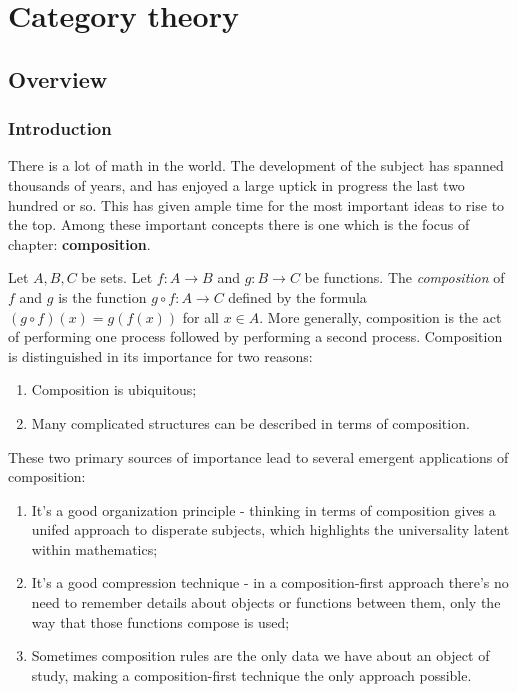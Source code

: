\section{Category theory}
\label{category-theory}

\subsection{Overview}

\subsubsection{Introduction}

There is a lot of math in the world. The development of the subject has spanned thousands of years, and has enjoyed a large uptick in progress the last two hundred or so. This has given ample time for the most important ideas to rise to the top. Among these important concepts there is one which is the focus of chapter: \textbf{composition}.

Let $A,B,C$ be sets. Let $f:A\to B$ and $g:B\to C$ be functions. The {\em composition} of $f$ and $g$ is the function $g\circ f: A\to C$ defined by the formula $(g\circ f)(x)=g(f(x))$ for all $x\in A$. More generally, composition is the act of performing one process followed by performing a second process. Composition is distinguished in its importance for two reasons:

\begin{enumerate}
\item Composition is ubiquitous;
\item Many complicated structures can be described in terms of composition.
\end{enumerate}

These two primary sources of importance lead to several emergent applications of composition:

\begin{enumerate}
\item It's a good organization principle - thinking in terms of composition gives a unifed approach to disperate subjects, which highlights the universality latent within mathematics;
\item It's a good compression technique - in a composition-first approach there's no need to remember details about objects or functions between them, only the way that those functions compose is used;
\item Sometimes composition rules are the only data we have about an object of study, making a composition-first technique the only approach possible.
\end{enumerate}

